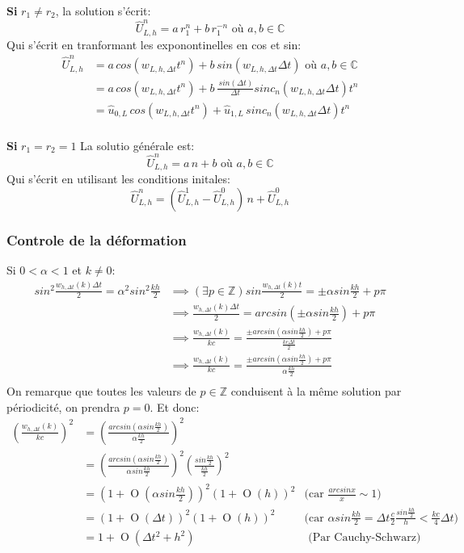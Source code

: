 \documentclass{article}
\newcommand{\BigO}[1]{\ensuremath{\operatorname{O}\left(#1\right)}}
\newcommand{\Wrap}[1]{\ensuremath{\left(#1\right)}}
\begin{document}
\textbf{Si}  $r_1 \neq r_2$, la solution s'écrit:
$$ \hat{U}^n_{L,h} = a \, r_1^n + b \, r_1^{-n} \text{ où } a, b \in \mathbb{C} $$
Qui s'écrit en tranformant les exponontinelles en cos et sin:
\begin{align*}
\hat{U}^n_{L,h} 
&= a \, cos(w_{L,h,\Delta t} t^n) + b \, sin(w_{L,h,\Delta t} \Delta t)  \text{ où } a, b \in \mathbb{C} \\
&= a \, cos(w_{L,h,\Delta t} t^n) + b \, \frac{\,sin(\Delta t)}{\Delta t} sinc_n(w_{L,h,\Delta t} \Delta t ) t^n \\
&= \hat{u}_{0,L} \, cos(w_{L,h,\Delta t} t^n) + \hat{u}_{1,L} \, sinc_n(w_{L,h,\Delta t} \Delta t ) t^n \\
\end{align*}

\textbf{Si}  $r_1 = r_2 = 1$
La solutio générale est:
$$ \hat{U}^n_{L,h} = a \, n + b \text{ où } a, b \in \mathbb{C} $$
Qui s'écrit en utilisant les conditions initales:
$$ \hat{U}^n_{L,h} = ( \hat{U}^1_{L,h} - \hat{U}^0_{L,h} )\, n + \hat{U}^0_{L,h} $$



\subsubsection*{Controle de la déformation}
Si $ 0 < \alpha < 1 $ et $ k \neq 0 $:
\begin{align*}
sin^2 \frac{w_{h, \Delta t} (k) \Delta t}{2} = \alpha ^ 2 sin^2 \frac{kh}{2}
& \implies (\exists p \in \mathbb{Z}) sin \frac{w_{h, \Delta t} (k) t}{2} = \pm \alpha  sin \frac{kh}{2} + p \pi \\
& \implies \frac{w_{h, \Delta t} (k) \Delta t}{2} = arcsin( \pm \alpha  sin \frac{kh}{2} ) + p \pi \\
& \implies \frac{w_{h, \Delta t} (k)}{k c} = \frac{\pm arcsin( \alpha  sin \frac{kh}{2} )  + p \pi}{ \frac{k c \Delta t}{2} }\\
& \implies \frac{w_{h, \Delta t} (k)}{k c} = \frac{\pm arcsin( \alpha  sin \frac{kh}{2} )  + p \pi}{ \alpha \frac{k h}{2} }\\
\end{align*}
On remarque que toutes les valeurs de $p \in \mathbb{Z}$ conduisent à la même solution par périodicité, on prendra $p = 0$.
Et donc:
\begin{align*}
\Wrap{ \frac{w_{h, \Delta t} (k)}{k c} }^2 
&= \Wrap{\frac{arcsin( \alpha  sin \frac{kh}{2} )}{ \alpha \frac{k h}{2} } }^2 \\
&= \Wrap{\frac{ arcsin( \alpha  sin \frac{kh}{2} )}{ \alpha sin \frac{k h}{2} } }^2 \Wrap{ \frac{sin \frac{k h}{2} } {  \frac{k h}{2} } }^2 \\
&= \Wrap{ 1 + \BigO{ \alpha  sin \frac{kh}{2} } }^2 \Wrap{ 1 + \BigO{ h} }^2 
& \text{(car $\frac{arcsin x}{x} \sim 1 $)}\\
&= \Wrap{ 1 + \BigO{ \Delta t } }^2 \Wrap{ 1 + \BigO{ h} }^2 
& \text{(car $\alpha  sin \frac{kh}{2} =\Delta t \frac{c}{2}  \frac{sin \frac{kh}{2}}{h} < \frac{k c}{4}\Delta t  $)}\\ 
&= 1 + \BigO { \Delta t^2 + h^2 }
& \text{ (Par Cauchy-Schwarz) }
\end{align*}
\end{document}
